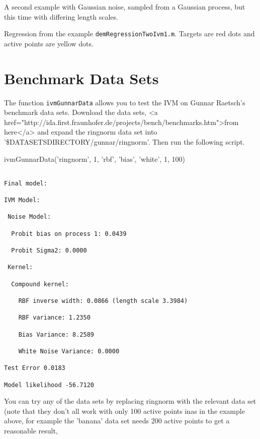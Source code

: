 A second example with Gaussian noise, sampled from a Gaussian process, but this time with differing length scales.



\begin{center}

Regression from the example \texttt{demRegressionTwoIvm1.m}. Targets are red dots and active points are yellow dots.\end{center}



\section{Benchmark Data Sets}



The function \texttt{ivmGunnarData} allows you to test the IVM on Gunnar Raetsch's benchmark data sets. Download the data sets, <a href="http://ida.first.fraunhofer.de/projects/bench/benchmarks.htm">from here</a> and expand the ringnorm data set into '\$DATASETSDIRECTORY/gunnar/ringnorm'. Then run the following script.





\begin{octave}
ivmGunnarData('ringnorm', 1, {'rbf', 'bias', 'white'}, 1, 100)
\end{octave}
\begin{verbatim}

Final model:

IVM Model:

 Noise Model:

  Probit bias on process 1: 0.0439

  Probit Sigma2: 0.0000

 Kernel:

  Compound kernel:

    RBF inverse width: 0.0866 (length scale 3.3984)

    RBF variance: 1.2350

    Bias Variance: 8.2589

    White Noise Variance: 0.0000

Test Error 0.0183

Model likelihood -56.7120

\end{verbatim}



You can try any of the data sets by replacing ringnorm with the relevant data set (note that they don't all work with only 100 active points inas in the example above, for example the 'banana' data set needs 200 active points to get a reasonable result,



